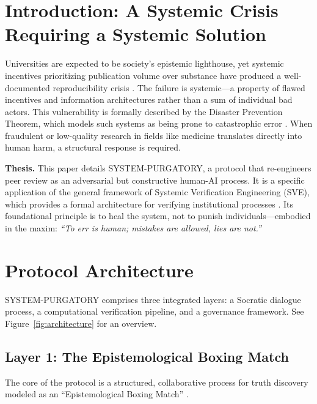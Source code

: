 \documentclass[11pt,a4paper]{article}
\begin{document}
\vspace{0.5cm}
\clearpage
\setcounter{page}{1}

\section{Introduction: A Systemic Crisis Requiring a Systemic Solution}
Universities are expected to be society's epistemic lighthouse, yet systemic incentives prioritizing publication volume over substance have produced a well-documented reproducibility crisis \citep{Ioannidis2005}. The failure is systemic—a property of flawed incentives and information architectures rather than a sum of individual bad actors. This vulnerability is formally described by the Disaster Prevention Theorem, which models such systems as being prone to catastrophic error \citep{Kovnatsky2025SVE1}. When fraudulent or low-quality research in fields like medicine translates directly into human harm, a structural response is required.

\textbf{Thesis.} This paper details SYSTEM-PURGATORY, a protocol that re-engineers peer review as an adversarial but constructive human-AI process. It is a specific application of the general framework of Systemic Verification Engineering (SVE), which provides a formal architecture for verifying institutional processes \citep{Kovnatsky2025SVE2}. Its foundational principle is to heal the system, not to punish individuals—embodied in the maxim: \textit{``To err is human; mistakes are allowed, lies are not.''}

\section{Protocol Architecture}
SYSTEM-PURGATORY comprises three integrated layers: a Socratic dialogue process, a computational verification pipeline, and a governance framework. See Figure~\ref{fig:architecture} for an overview.

\subsection{Layer 1: The Epistemological Boxing Match}
The core of the protocol is a structured, collaborative process for truth discovery modeled as an ``Epistemological Boxing Match'' \citep{Kovnatsky2025Boxing}.
\end{document}
